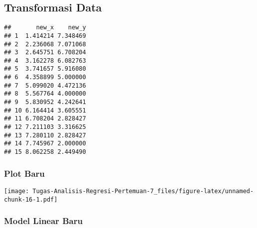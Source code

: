\documentclass[
]{article}
\newenvironment{Shaded}{\begin{snugshade}}{\end{snugshade}}
\newcommand{\AttributeTok}[1]{\textcolor[rgb]{0.13,0.29,0.53}{#1}}
\newcommand{\FunctionTok}[1]{\textcolor[rgb]{0.13,0.29,0.53}{\textbf{#1}}}
\newcommand{\NormalTok}[1]{#1}
\newcommand{\OtherTok}[1]{\textcolor[rgb]{0.56,0.35,0.01}{#1}}
\newcommand{\SpecialCharTok}[1]{\textcolor[rgb]{0.81,0.36,0.00}{\textbf{#1}}}
\begin{document}
\hypertarget{transformasi-data}{%
\subsection{Transformasi Data}\label{transformasi-data}}

\begin{Shaded}
\end{Shaded}

\begin{verbatim}
##       new_x    new_y
## 1  1.414214 7.348469
## 2  2.236068 7.071068
## 3  2.645751 6.708204
## 4  3.162278 6.082763
## 5  3.741657 5.916080
## 6  4.358899 5.000000
## 7  5.099020 4.472136
## 8  5.567764 4.000000
## 9  5.830952 4.242641
## 10 6.164414 3.605551
## 11 6.708204 2.828427
## 12 7.211103 3.316625
## 13 7.280110 2.828427
## 14 7.745967 2.000000
## 15 8.062258 2.449490
\end{verbatim}

\hypertarget{plot-baru}{%
\subsubsection{Plot Baru}\label{plot-baru}}

\begin{Shaded}
\end{Shaded}

\texttt{[image: Tugas-Analisis-Regresi-Pertemuan-7\_files/figure-latex/unnamed-chunk-16-1.pdf]}

\hypertarget{model-linear-baru}{%
\subsubsection{Model Linear Baru}\label{model-linear-baru}}

\begin{Shaded}
\end{Shaded}
\end{document}
